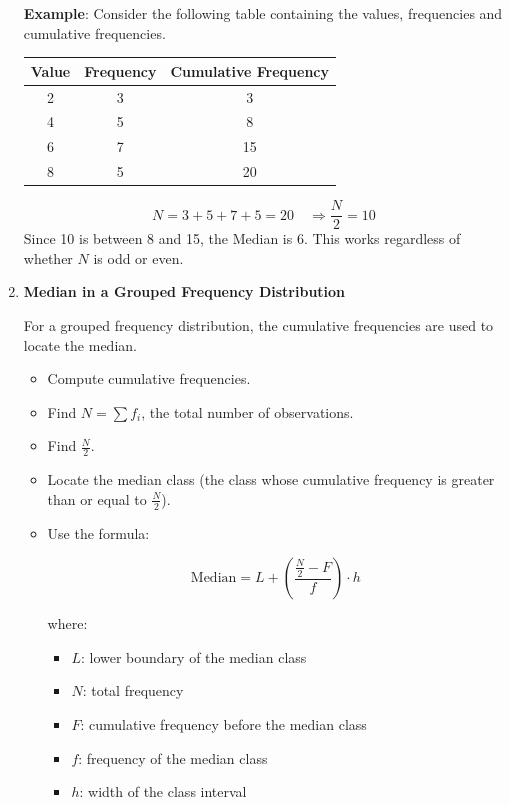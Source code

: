 \documentclass[twoside]{book}
\begin{document}
\begin{enumerate}
\textbf{Example}: Consider the following table containing the values, frequencies and cumulative frequencies.

\begin{center}
\begin{tabular}{c|c|c}
\hline
Value & Frequency & Cumulative Frequency\\
\hline
2 & 3 & 3\\ 
4 & 5 & 8\\
6 & 7 & 15\\
8 & 5 & 20\\
\hline
\end{tabular}
\end{center}

\[
N = 3 + 5 + 7 + 5 = 20 \quad \Rightarrow \frac{N}{2} = 10
\]
Since 10 is between 8 and 15, the Median is 6. This works regardless of whether $N$ is odd or even.

\item \textbf{Median in a Grouped Frequency Distribution}

For a grouped frequency distribution, the cumulative frequencies are used to locate the median.

\begin{itemize}
    \item Compute cumulative frequencies.
    \item Find \( N = \sum f_i \), the total number of observations.
    \item Find \( \frac{N}{2} \).
    \item Locate the median class (the class whose cumulative frequency is greater than or equal to \( \frac{N}{2} \)).
    \item Use the formula:
    \begin{textbox}
    \[
    \text{Median} = L + \left( \frac{\frac{N}{2} - F}{f} \right) \cdot h
    \]
    \end{textbox}
    where:
    \begin{itemize}
        \item \( L \): lower boundary of the median class
        \item \( N \): total frequency
        \item \( F \): cumulative frequency before the median class
        \item \( f \): frequency of the median class
        \item \( h \): width of the class interval
    \end{itemize}
\end{itemize}


\end{enumerate}
\end{document}
